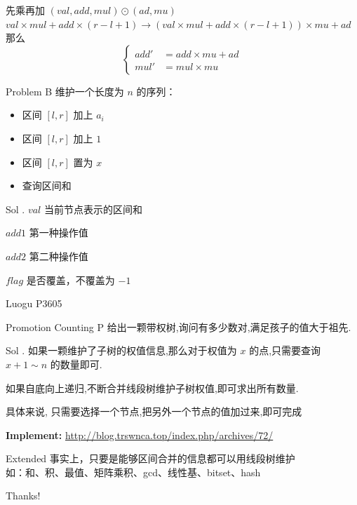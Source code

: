 \documentclass{beamer}
\begin{document}
\begin{frame}{先乘再加}
    $(val, add, mul) \odot (ad, mu)$
    $val\times mul + add \times (r -l + 1) \longrightarrow (val \times mul + add \times (r -l + 1)) \times mu + ad$
    \pause
    那么 $$\begin{cases} add' &= add \times mu + ad \\ mul' &= mul \times mu\end{cases}$$
\end{frame}

\begin{frame}{Problem B}
维护一个长度为 $n$ 的序列：

\begin{itemize}
    \item 区间 $[l, r]$ 加上 $a_i$
    \item 区间 $[l, r]$ 加上 $1$
    \item 区间 $[l, r]$ 置为 $x$
    \item 查询区间和
\end{itemize}
\end{frame}

\begin{frame}{Sol .}
    $val$ 当前节点表示的区间和
    
    $add1$ 第一种操作值
    
    $add2$ 第二种操作值
    
    $flag$ 是否覆盖，不覆盖为 $-1$
\end{frame}

\begin{frame}{Luogu P3605}
\begin{block}{Promotion Counting P}
给出一颗带权树,询问有多少数对,满足孩子的值大于祖先.
\end{block}

\pause
\begin{block}{Sol .}
如果一颗维护了子树的权值信息,那么对于权值为 $x$ 的点,只需要查询 $x+1 \sim n$ 的数量即可.

如果自底向上递归,不断合并线段树维护子树权值,即可求出所有数量.

具体来说, 只需要选择一个节点,把另外一个节点的值加过来,即可完成

\textbf{Implement:} \url{http://blog.trswnca.top/index.php/archives/72/}
\end{block}
\end{frame}


\begin{frame}{Extended}
   事实上，只要是能够区间合并的信息都可以用线段树维护
   ~\\
   如：和、积、最值、矩阵乘积、gcd、线性基、bitset、hash
\end{frame}

\begin{frame}
\begin{center}
{\Huge\calligra Thanks!}
\end{center}
\end{frame}
\end{document}
